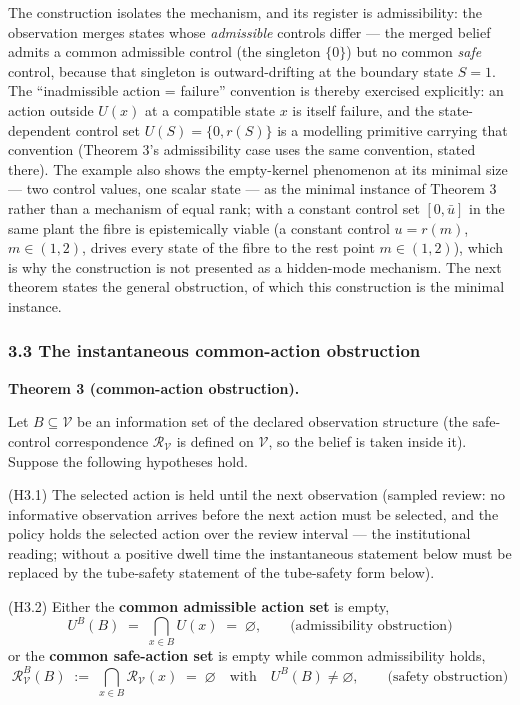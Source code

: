 \documentclass[11pt]{article}
\begin{document}
The construction isolates the mechanism, and its register is
admissibility: the observation merges states whose \emph{admissible}
controls differ --- the merged belief admits a common admissible control
(the singleton \(\{0\}\)) but no common \emph{safe} control, because
that singleton is outward-drifting at the boundary state \(S = 1\). The
``inadmissible action = failure'' convention is thereby exercised
explicitly: an action outside \(U(x)\) at a compatible state \(x\) is
itself failure, and the state-dependent control set
\(U(S) = \{0, r(S)\}\) is a modelling primitive carrying that convention
(Theorem 3's admissibility case uses the same convention, stated there).
The example also shows the empty-kernel phenomenon at its minimal size
--- two control values, one scalar state --- as the minimal instance of
Theorem 3 rather than a mechanism of equal rank; with a constant control
set \([0, \bar u]\) in the same plant the fibre is epistemically viable
(a constant control \(u = r(m)\), \(m \in (1,2)\), drives every state of
the fibre to the rest point \(m \in (1,2)\)), which is why the
construction is not presented as a hidden-mode mechanism. The next
theorem states the general obstruction, of which this construction is
the minimal instance.

\subsubsection{3.3 The instantaneous common-action
obstruction}\label{the-instantaneous-common-action-obstruction}

\textbf{Theorem 3 (common-action obstruction).}

Let \(B \subseteq \mathcal{V}\) be an information set of the declared
observation structure (the safe-control correspondence
\(\mathcal{R}_{\mathcal{V}}\) is defined on \(\mathcal{V}\), so the
belief is taken inside it). Suppose the following hypotheses hold.

(H3.1) The selected action is held until the next observation (sampled
review: no informative observation arrives before the next action must
be selected, and the policy holds the selected action over the review
interval --- the institutional reading; without a positive dwell time
the instantaneous statement below must be replaced by the tube-safety
statement of the tube-safety form below).

(H3.2) Either the \textbf{common admissible action set} is empty,
\[U^B(B) \;=\; \bigcap_{x \in B} U(x) \;=\; \varnothing, \qquad \text{(admissibility obstruction)}\]
or the \textbf{common safe-action set} is empty while common
admissibility holds,
\[\mathcal{R}_{\mathcal{V}}^B(B) \;:=\; \bigcap_{x \in B} \mathcal{R}_{\mathcal{V}}(x) \;=\; \varnothing \quad \text{with} \quad U^B(B) \neq \varnothing, \tag{2} \qquad \text{(safety obstruction)}\]
\end{document}
